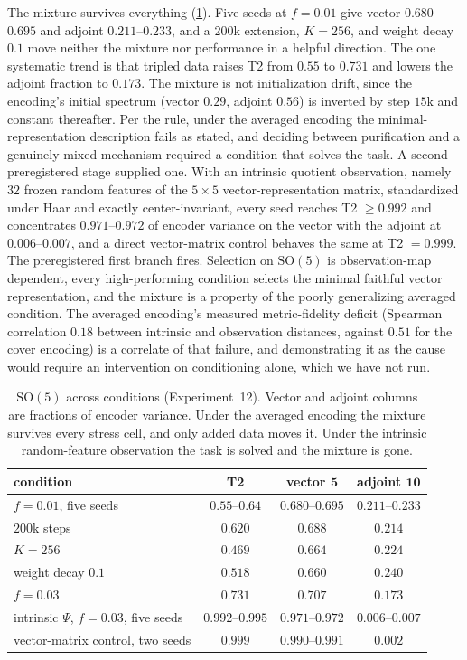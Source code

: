 \documentclass{article}
\newcommand{\SO}{\mathrm{SO}}
\begin{document}
The mixture survives everything
(\cref{tab:so5}). Five seeds at $f = 0.01$ give vector
$0.680$--$0.695$ and adjoint $0.211$--$0.233$, and a $200$k
extension, $K = 256$, and weight decay $0.1$ move neither the
mixture nor performance in a helpful direction. The one systematic
trend is that tripled data raises T2 from $0.55$ to $0.731$ and
lowers the adjoint fraction to $0.173$. The mixture is not
initialization drift, since the encoding's initial spectrum (vector
$0.29$, adjoint $0.56$) is inverted by step $15$k and constant
thereafter. Per the rule, under the averaged encoding the minimal-representation
description fails as stated, and deciding between purification and a
genuinely mixed mechanism required a condition that solves the task. A
second preregistered stage supplied one. With an intrinsic quotient
observation, namely $32$ frozen random features of the $5 \times 5$
vector-representation matrix, standardized under Haar and exactly
center-invariant, every seed reaches T2 $\geq 0.992$ and concentrates
$0.971$--$0.972$ of encoder variance on the vector with the adjoint at
$0.006$--$0.007$, and a direct vector-matrix control behaves the same at
T2 $= 0.999$. The preregistered first branch fires. Selection on
$\SO(5)$ is observation-map dependent, every high-performing condition
selects the minimal faithful vector representation, and the mixture is a
property of the poorly generalizing averaged condition. The averaged
encoding's measured metric-fidelity deficit (Spearman correlation $0.18$
between intrinsic and observation distances, against $0.51$ for the
cover encoding) is a correlate of that failure, and demonstrating it as
the cause would require an intervention on conditioning alone, which we
have not run.

\begin{table}[t]
\centering
\caption{$\SO(5)$ across conditions (Experiment~12). Vector and adjoint
columns are fractions of encoder variance. Under the averaged encoding
the mixture survives every stress cell, and only added data moves it.
Under the intrinsic random-feature observation the task is solved and
the mixture is gone.}
\label{tab:so5}
\small
\begin{tabular}{lccc}
\toprule
condition & T2 & vector $\mathbf{5}$ & adjoint $\mathbf{10}$ \\
\midrule
$f = 0.01$, five seeds & $0.55$--$0.64$ & $0.680$--$0.695$ & $0.211$--$0.233$ \\
$200$k steps & $0.620$ & $0.688$ & $0.214$ \\
$K = 256$ & $0.469$ & $0.664$ & $0.224$ \\
weight decay $0.1$ & $0.518$ & $0.660$ & $0.240$ \\
$f = 0.03$ & $0.731$ & $0.707$ & $0.173$ \\
\midrule
intrinsic $\Psi$, $f = 0.03$, five seeds & $0.992$--$0.995$ & $0.971$--$0.972$ & $0.006$--$0.007$ \\
vector-matrix control, two seeds & $0.999$ & $0.990$--$0.991$ & $0.002$ \\
\bottomrule
\end{tabular}
\end{table}
\end{document}

